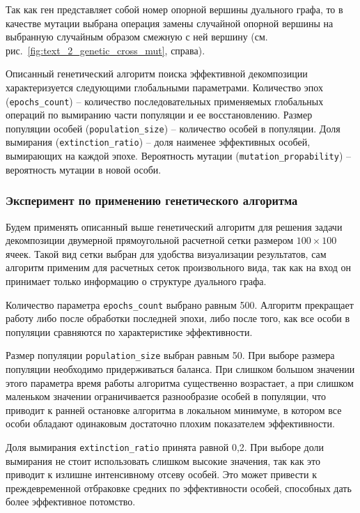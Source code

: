 Так как ген представляет собой номер опорной вершины дуального графа, то в качестве мутации выбрана операция замены случайной опорной вершины на выбранную случайным образом смежную с ней вершину (см. рис.~\ref{fig:text_2_genetic_cross_mut}, справа).

Описанный генетический алгоритм поиска эффективной декомпозиции характеризуется следующими глобальными параметрами. Количество эпох (\texttt{epochs\_count}) -- количество последовательных применяемых глобальных операций по вымиранию части популяции и ее восстановлению.
Размер популяции особей (\texttt{population\_size}) -- количество особей в популяции.
Доля вымирания (\texttt{extinction\_ratio}) – доля наименее эффективных особей, вымирающих на каждой эпохе.
Вероятность мутации (\texttt{mutation\_propability}) -- вероятность мутации в новой особи.

\subsubsection{Эксперимент по применению генетического алгоритма}

Будем применять описанный выше генетический алгоритм для решения задачи декомпозиции двумерной прямоугольной расчетной сетки размером $100 \times 100$ ячеек.
Такой вид сетки выбран для удобства визуализации результатов, сам алгоритм применим для расчетных сеток произвольного вида, так как на вход он принимает только информацию о структуре дуального графа.

Количество параметра \texttt{epochs\_count} выбрано равным 500.
Алгоритм прекращает работу либо после обработки последней эпохи, либо после того, как все особи в популяции сравняются по характеристике эффективности.

Размер популяции \texttt{population\_size} выбран равным 50.
При выборе размера популяции необходимо придерживаться баланса.
При слишком большом значении этого параметра время работы алгоритма существенно возрастает, а при слишком маленьком значении ограничивается разнообразие особей в популяции, что приводит к ранней остановке алгоритма в локальном минимуме, в котором все особи обладают одинаковым достаточно плохим показателем эффективности.

Доля вымирания \texttt{extinction\_ratio} принята равной 0,2.
При выборе доли вымирания не стоит использовать слишком высокие значения, так как это приводит к излишне интенсивному отсеву особей.
Это может привести к преждевременной отбраковке средних по эффективности особей, способных дать более эффективное потомство.

